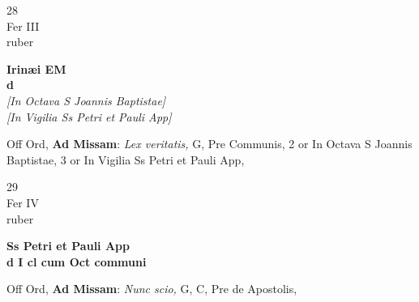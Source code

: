 \documentclass[10pt, openany]{book}
\begin{document}
        \begin{center}
            \begin{minipage}{3.5in}
                \vspace{2em}
                \begin{minipage}{0.5in}
                    {\Huge 28} \\
                    {\normalsize Fer III} \\
                    {\normalsize ruber}
                \end{minipage}
                \begin{minipage}{3.0in}
                    \textbf{ \large Irinæi EM \\
                    \textnormal{\normalsize d}} \\ \textit{[In Octava S Joannis Baptistae]} \\ \textit{[In Vigilia Ss Petri et Pauli App]} \\ 
                \end{minipage}
                \begin{justify}Off Ord, \textbf{Ad Missam}: \textit{Lex veritatis,} G, Pre Communis, 2 or In Octava S Joannis Baptistae, 3 or In Vigilia Ss Petri et Pauli App,   
                \end{justify}
            \end{minipage}
        \end{center}
    
        \begin{center}
            \begin{minipage}{3.5in}
                \vspace{2em}
                \begin{minipage}{0.5in}
                    {\Huge 29} \\
                    {\normalsize Fer IV} \\
                    {\normalsize ruber}
                \end{minipage}
                \begin{minipage}{3.0in}
                    \textbf{ \large Ss Petri et Pauli App \\
                    \textnormal{\normalsize d I cl cum Oct communi}} \\ 
                \end{minipage}
                \begin{justify}Off Ord, \textbf{Ad Missam}: \textit{Nunc scio,} G, C, Pre de Apostolis,   
                \end{justify}
            \end{minipage}
        \end{center}
    
\end{document}
